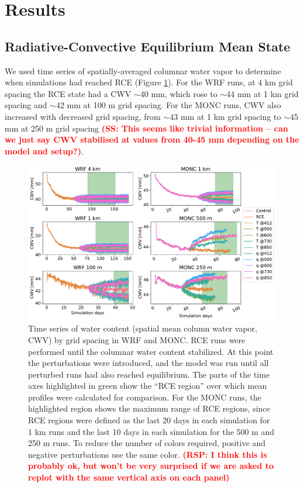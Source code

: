 \documentclass[draft]{agujournal2019}
\newcommand{\todo}[1]{\textcolor{red}{\textbf{(#1)}}}
\begin{document}
\section{Results}
\label{sec:results}

\subsection{Radiative-Convective Equilibrium Mean State}

We used time series of spatially-averaged columnar water vapor to determine
when simulations had reached RCE (Figure \ref{fig:rce_pw}). For the WRF runs, at
4 km grid spacing the RCE state had a CWV $\sim$40 mm, which rose to $\sim$44 mm
at 1 km grid spacing and $\sim$42 mm at 100 m grid spacing. For the MONC runs,
CWV also increased with decreased grid spacing, from $\sim$43 mm at 1 km grid
spacing to $\sim$45 mm at 250 m grid spacing \todo{SS: This seems like trivial information -- can we just say CWV stabilised at values from 40-45 mm depending on the model and setup?}.

\begin{figure}[pth]
    \noindent\includegraphics[width=\textwidth]{figures/runs_timeseries.pdf}
    \caption{Time series of water content (spatial mean column water vapor, CWV)
    by grid spacing in WRF and MONC. RCE runs were performed until the columnar
    water content stabilized. At this point the perturbations were introduced,
    and the model was run until all perturbed runs had also reached equilibrium.
    The parts of the time axes highlighted in green show the ``RCE region'' over
    which mean profiles were calculated for comparison. For the MONC runs, the
    highlighted region shows the maximum range of RCE regions, since RCE regions
    were defined as the last 20 days in each simulation for 1 km runs and the
    last 10 days in each simulation for the 500 m and 250 m runs. To reduce the
    number of colors required, positive and negative perturbations use the same
    color. \todo{RSP: I think this is probably ok, but won't be very surprised if we are asked to replot with the same vertical axis on each panel}}
    \label{fig:rce_pw}
\end{figure}
\end{document}
